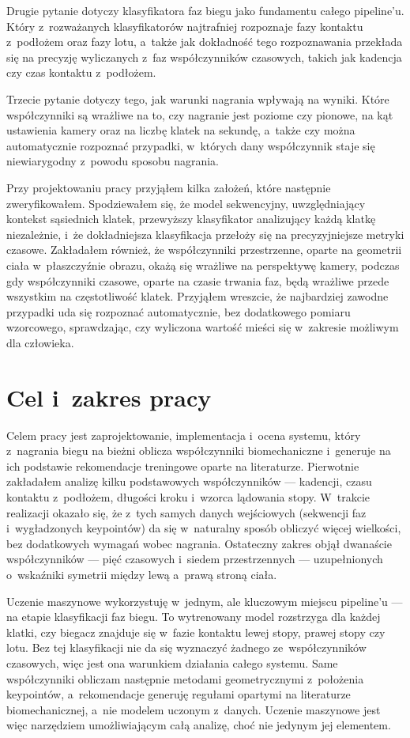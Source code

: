 Drugie pytanie dotyczy klasyfikatora faz biegu jako fundamentu całego pipeline'u. Który z~rozważanych klasyfikatorów najtrafniej rozpoznaje fazy kontaktu z~podłożem oraz fazy lotu, a~także jak dokładność tego rozpoznawania przekłada się na precyzję wyliczanych z~faz współczynników czasowych, takich jak kadencja czy czas kontaktu z~podłożem.

Trzecie pytanie dotyczy tego, jak warunki nagrania wpływają na wyniki. Które współczynniki są wrażliwe na to, czy nagranie jest poziome czy pionowe, na kąt ustawienia kamery oraz na liczbę klatek na sekundę, a~także czy można automatycznie rozpoznać przypadki, w~których dany współczynnik staje się niewiarygodny z~powodu sposobu nagrania.

Przy projektowaniu pracy przyjąłem kilka założeń, które następnie zweryfikowałem. Spodziewałem się, że model sekwencyjny, uwzględniający kontekst sąsiednich klatek, przewyższy klasyfikator analizujący każdą klatkę niezależnie, i~że dokładniejsza klasyfikacja przełoży się na precyzyjniejsze metryki czasowe. Zakładałem również, że współczynniki przestrzenne, oparte na geometrii ciała w~płaszczyźnie obrazu, okażą się wrażliwe na perspektywę kamery, podczas gdy współczynniki czasowe, oparte na czasie trwania faz, będą wrażliwe przede wszystkim na częstotliwość klatek. Przyjąłem wreszcie, że najbardziej zawodne przypadki uda się rozpoznać automatycznie, bez dodatkowego pomiaru wzorcowego, sprawdzając, czy wyliczona wartość mieści się w~zakresie możliwym dla człowieka. 

\section{Cel i~zakres pracy}
\label{sec:cel-zakres}

Celem pracy jest zaprojektowanie, implementacja i~ocena systemu, który z~nagrania biegu na bieżni oblicza współczynniki biomechaniczne i~generuje na ich podstawie rekomendacje treningowe oparte na literaturze.
\newpage
Pierwotnie zakładałem analizę kilku podstawowych współczynników --- kadencji, czasu kontaktu z~podłożem, długości kroku i~wzorca lądowania stopy. W~trakcie realizacji okazało się, że z~tych samych danych wejściowych (sekwencji faz i~wygładzonych keypointów) da się w~naturalny sposób obliczyć więcej wielkości, bez dodatkowych wymagań wobec nagrania. Ostateczny zakres objął dwanaście współczynników --- pięć czasowych i~siedem przestrzennych --- uzupełnionych o~wskaźniki symetrii między lewą a~prawą stroną ciała.

Uczenie maszynowe wykorzystuję w~jednym, ale kluczowym miejscu pipeline'u --- na etapie klasyfikacji faz biegu. To wytrenowany model rozstrzyga dla każdej klatki, czy biegacz znajduje się w~fazie kontaktu lewej stopy, prawej stopy czy lotu. Bez tej klasyfikacji nie da się wyznaczyć żadnego ze~współczynników czasowych, więc jest ona warunkiem działania całego systemu. Same współczynniki obliczam następnie metodami geometrycznymi z~położenia keypointów, a~rekomendacje generuję regułami opartymi na literaturze biomechanicznej, a~nie modelem uczonym z~danych. Uczenie maszynowe jest więc narzędziem umożliwiającym całą analizę, choć nie jedynym jej elementem.
